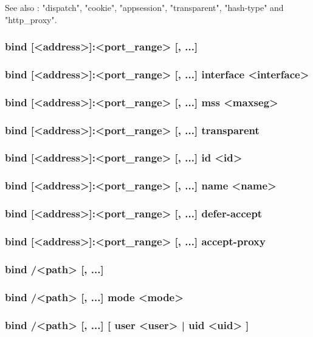  See also : "dispatch", "cookie", "appsession", "transparent", "hash-type" and
             "http\_proxy".

\subsubsection[bind]{bind [<address>]:<port\_range> [, ...]}
\subsubsection*{bind [<address>]:<port\_range> [, ...] interface <interface>}
\subsubsection*{bind [<address>]:<port\_range> [, ...] mss <maxseg>}
\subsubsection*{bind [<address>]:<port\_range> [, ...] transparent}
\subsubsection*{bind [<address>]:<port\_range> [, ...] id <id>}
\subsubsection*{bind [<address>]:<port\_range> [, ...] name <name>}
\subsubsection*{bind [<address>]:<port\_range> [, ...] defer-accept}
\subsubsection*{bind [<address>]:<port\_range> [, ...] accept-proxy}
\subsubsection*{bind /<path> [, ...]}
\subsubsection*{bind /<path> [, ...] mode <mode>}
\subsubsection*{bind /<path> [, ...] [ user <user> | uid <uid> ]}
